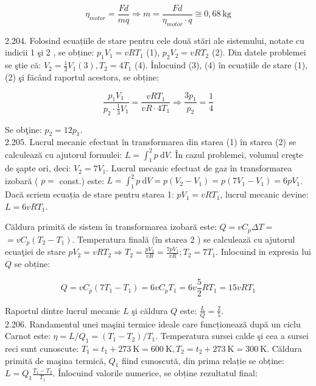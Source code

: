 \documentclass[10pt]{article}
\begin{document}
$$
\eta_{m o t o r}=\frac{F d}{m q} \Rightarrow m=\frac{F d}{\eta_{m o t o r} \cdot q} \cong 0,68 \mathrm{~kg}
$$

2.204. Folosind ecuațiile de stare pentru cele două stări ale sistemului, notate cu indicii 1 şi 2 , se obține: $p_{1} V_{1}=v R T_{1}$ (1), $p_{2} V_{2}=v R T_{2}$ (2). Din datele problemei se ştie că: $V_{2}=\frac{1}{3} V_{1}(3), T_{2}=4 T_{1}$ (4). Înlocuind (3), (4) în ecuațiile de stare (1), (2) şi fäcând raportul acestora, se obține:


\begin{equation*}
\frac{p_{1} V_{1}}{p_{2} \cdot \frac{1}{3} V_{1}}=\frac{v R T_{1}}{v R \cdot 4 T_{1}} \Rightarrow \frac{3 p_{1}}{p_{2}}=\frac{1}{4} \tag{5}
\end{equation*}


Se obţine: $p_{2}=12 p_{1}$.\\
2.205. Lucrul mecanic efectuat în transformarea din starea (1) în starea (2) se calculează cu ajutorul formulei: $L=\int_{1}^{2} p \mathrm{~d} V$. În cazul problemei, volumul creşte de şapte ori, deci: $V_{2}=7 V_{1}$. Lucrul mecanic efectuat de gaz în transformarea izobară ( $p=$ const.) este: $L=\int_{1}^{2} p \mathrm{~d} V=p\left(V_{2}-V_{1}\right)=p\left(7 V_{1}-V_{1}\right)=6 p V_{1}$. Dacă scriem ecuația de stare pentru starea 1: $p V_{1}=v R T_{1}$, lucrul mecanic devine: $L=6 v R T_{1}$.

Căldura primită de sistem în transformarea izobară este: $Q=v C_{p} \Delta T=$ $=v C_{p}\left(T_{2}-T_{1}\right)$. Temperatura finală (în starea 2 ) se calculează cu ajutorul ecuaţiei de stare $p V_{2}=v R T_{2} \Rightarrow T_{2}=\frac{p V_{2}}{v R}=\frac{7 p V_{1}}{v R} ; T_{2}=7 T_{1}$. Inlocuind in expresia lui $Q$ se obține:

$$
Q=v C_{p}\left(7 T_{1}-T_{1}\right)=6 v C_{p} T_{1}=6 v \frac{5}{2} R T_{1}=15 v R T_{1}
$$

Raportul dintre lucrul mecanic $L$ şi căldura $Q$ este: $\frac{L}{Q}=\frac{2}{5}$.\\
2.206. Randamentul unei maşini termice ideale care funcționează după un ciclu Carnot este: $\eta=L / Q_{1}=\left(T_{1}-T_{2}\right) / T_{1}$. Temperatura sursei calde şi cea a sursei reci sunt cunoscute: $T_{1}=t_{1}+273 \mathrm{~K}=600 \mathrm{~K}, T_{2}=t_{2}+273 \mathrm{~K}=300 \mathrm{~K}$. Căldura primită de maşina termică, $Q_{1}$ fiind cunoscută, din prima relație se obține: $L=Q_{1} \frac{T_{1}-T_{2}}{T_{1}}$. Înlocuind valorile numerice, se obține rezultatul final:
\end{document}
